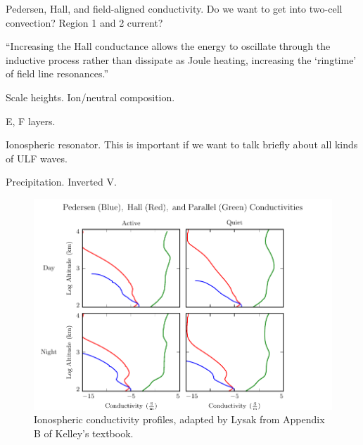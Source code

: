 Pedersen, Hall, and field-aligned conductivity. Do we want to get into two-cell convection? Region 1 and 2 current? 


``Increasing the Hall conductance allows the energy to oscillate through the inductive process rather than dissipate as Joule heating, increasing the `ringtime' of field line resonances.''\cite{waters_2013}

Scale heights. Ion/neutral composition. 

E, F layers. 

Ionospheric \Alfven resonator. This is important if we want to talk briefly about all kinds of ULF waves. 

Precipitation. Inverted V. 


\begin{figure}[H]
    \centering
    \includegraphics[width=\textwidth]{figures/sigma.pdf}
    \caption[Ionospheric Conductivity Profiles]{
      Ionospheric conductivity profiles, adapted by Lysak\cite{lysak_2013} from Appendix B of Kelley's textbook\cite{kelley_1989}. 
    }
    \label{fig_sigma}
\end{figure}


